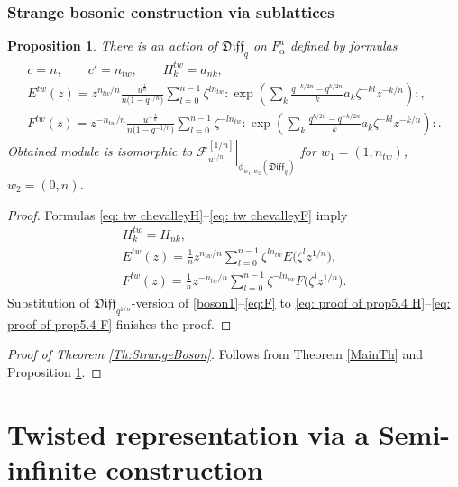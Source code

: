 \documentclass[pdftex]{sigma}
\numberwithin{equation}{section}
\newtheorem{Proposition}[Theorem]{Proposition}
\theoremstyle{definition}
\newcommand{\qD}{\mathfrak{Diff}_q}
\begin{document}
\subsubsection{Strange bosonic construction via sublattices}
\begin{Proposition} \label{Prop:StrangeBoson}
There is an action of $\qD$ on $F^a_{\alpha}$ defined by formulas
\begin{gather*}
c = n, \qquad
c' = n_{tw}, \qquad
H^{tw}_k = a_{nk}, \\
E^{tw}(z) = z^{n_{tw}/n} \frac{u^{\frac{1}{n}}}{n\big(1-q^{1/n}\big)} \sum_{l=0}^{n-1} \zeta^{l n_{tw}} : \! \exp \! \left( \sum_{k} \frac{q^{-k/2n}-q^{k/2n}}{k} a_{k} \zeta^{-kl} z^{-k/n} \right) \! :, \\
F^{tw}(z) = z^{-n_{tw}/n} \frac{u^{-\frac{1}{n}}}{n\big(1-q^{-1/n}\big)} \sum_{l=0}^{n-1} \zeta^{-l n_{tw}} : \! \exp \! \left( \sum_{k}\frac{q^{k/2n}-q^{-k/2n}}{k} a_{k} \zeta^{-kl} z^{-k/n} \right) \! : .
\end{gather*}
Obtained module is isomorphic to $\left. \mathcal{F}^{[1/n]}_{u^{1/n}} \right|_{\phi_{w_1, w_2}(\qD)}$ for $w_1=(1, n_{tw})$, $w_2=(0,n)$.
\end{Proposition}

\begin{proof}
Formulas \eqref{eq: tw chevalleyH}--\eqref{eq: tw chevalleyF} imply
\begin{gather}
H^{tw}_k = H_{nk}, \label{eq: proof of prop5.4 H}\\
E^{tw} (z) = \frac{1}{n} z^{n_{tw}/n} \sum_{l=0}^{n-1} \zeta^{ln_{tw}} E\big( \zeta^{l} z^{1/n} \big), \label{eq: proof of prop5.4 E} \\
F^{tw} (z) = \frac{1}{n} z^{-n_{tw}/n} \sum_{l=0}^{n-1} \zeta^{-ln_{tw}} F\big( \zeta^{l} z^{ 1/n } \big). \label{eq: proof of prop5.4 F}
\end{gather}
Substitution of $\mathfrak{Diff}_{q^{1/n}}$-version of \eqref{boson1}--\eqref{eq:F} to \eqref{eq: proof of prop5.4 H}--\eqref{eq: proof of prop5.4 F} finishes the proof.
\end{proof}
\begin{proof}[Proof of Theorem \ref{Th:StrangeBoson}] Follows from Theorem \ref{MainTh} and Proposition \ref{Prop:StrangeBoson}.
\end{proof}

\section{Twisted representation via a Semi-infinite construction}\label{S:Semi-infinite}
\end{document}
